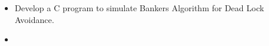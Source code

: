 \documentclass{article}
\newcommand{\question}[2]{
	\item [#1.] #2
}
\newcommand{\answer}[1]{\item [$\rightarrow$] \inputminted{c}{#1}}
\begin{document}
	\begin{itemize}
		\question{5}{
			Develop a C program to simulate Bankers Algorithm for Dead Lock Avoidance.
		}

		\answer{lab5.c}
	\end{itemize}
\end{document}
